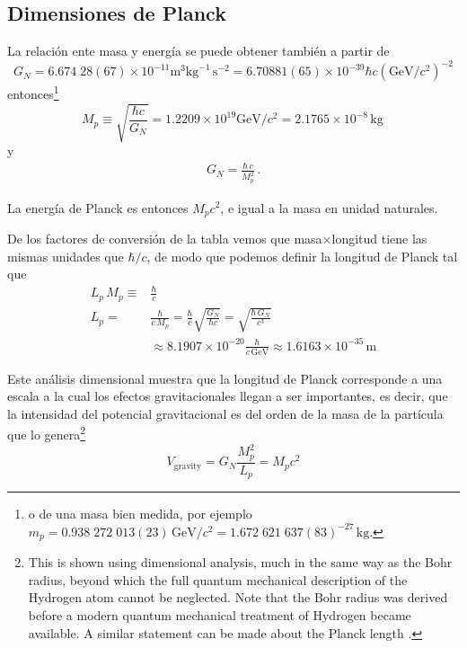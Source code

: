 \subsection{Dimensiones de Planck}


La relación ente masa y energía se puede obtener también a partir de 
\begin{equation}
  G_N=6.674\;28(67)\times10^{-11}\text{m}^3\text{kg}^{-1}\,\text{s}^{-2}=6.70881(65)\times10^{-39}\hbar c(\text{GeV}/c^2)^{-2}
\end{equation}
entonces\footnote{o de una masa bien medida, por ejemplo
  $m_p=0.938\;272\;013(23)\,\text{GeV}/c^2=1.672\;621\;637(83)^{-27}\,\text{kg}.$
}
\begin{equation}
  M_p\equiv\sqrt{\frac{\hbar c}{G_N}}=1.2209\times10^{19}\text{GeV}/c^2=2.1765\times10^{-8}\,\text{kg}\,
\end{equation}
y
\begin{align}
  \label{eq:242}
  G_N=\frac{\hbar\,c}{M_p^2}\,.
\end{align}

La energía de Planck es entonces $M_p c^2$, e igual a la masa en unidad naturales.


De los factores de conversión de la tabla vemos que masa$\times$longitud tiene las mismas unidades que $\hbar/c$, de modo que podemos definir la longitud de Planck tal que
\begin{align}
  L_p\,M_p\equiv&\frac{\hbar}{c}\nonumber\\
  L_p=&\frac{\hbar}{c\,M_p}=\frac{\hbar}{c}\sqrt{\frac{G_N}{\hbar c}}=\sqrt{\frac{\hbar\, G_N}{c^3}}\nonumber\\
  &\approx8.1907\times10^{-20}\frac{\hbar}{c\,\text{GeV}} \approx1.6163\times10^{-35}\,\text{m}
\end{align}

Este análisis dimensional muestra que la longitud de Planck corresponde a una escala a la cual los efectos gravitacionales llegan a ser importantes, es decir, que la intensidad del potencial gravitacional es del orden de la masa de la partícula que lo genera\footnote{This is shown using dimensional analysis, much in the same
way as the Bohr radius, beyond which the full quantum mechanical
description of the Hydrogen atom cannot be neglected. Note that the
Bohr radius was derived before a modern quantum mechanical treatment
of Hydrogen became available. A similar statement can be made about
the Planck length \cite{andim}.}
\begin{equation}
  \label{eq:241}
  V_{\text{gravity}}=G_N\frac{M_p^2}{L_p}=M_pc^2
\end{equation}


